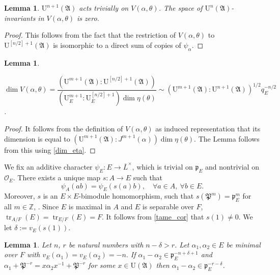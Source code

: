 \documentclass[11pt]{article}
\newcommand{\skpt}{\smallskip}
\let\mathcal\mathscr
\newtheorem{lem}[prop]{Lemma}
\theoremstyle{definition}
\DeclareMathOperator{\tr}{tr}
\newcommand{\ZZ}{\mathbb Z}
\newcommand{\Aa}{\mathfrak A}
\newcommand{\Pp}{\mathfrak P}
\newcommand{\cO}{\mathcal{O}}
\newcommand{\pp}{\mathfrak p}
\newcommand{\UU}{\mathrm U}
\newcommand{\Lbar}{\overline{L}}
\begin{document}
\begin{lem}\label{invariants_super} $\UU^{n+1}(\Aa)$ acts trivially on $V(\alpha, \theta)$. The space of $\UU^n(\Aa)$-invariants in $V(\alpha, \theta)$ is zero.
\end{lem}

\begin{proof} This follows from the fact that the restriction of $V(\alpha, \theta)$ to $\UU^{[n/2]+1}(\Aa)$ is isomorphic to a direct sum of copies of $\psi_{\alpha}$.
\end{proof}

\skpt
\begin{lem}\label{dim_V}\mbox{}\par\vspace*{-10pt}
\centerline{
$\dim V(\alpha, \theta)=\dfrac{( \UU^{m+1}(\Aa): \UU^{[n/2]+1}(\Aa))}{ (\UU^{m+1}_E : \UU^{[n/2]+1}_E)\dim \eta(\theta)}\sim (\UU^{m+1}(\Aa): \UU^{n+1}(\Aa))^{1/2} q_E^{-n/2}$.}
\end{lem}

\begin{proof} It follows from the definition of $V(\alpha, \theta)$ as induced representation that its dimension is equal to $(\UU^{m+1}(\Aa): J^{m+1}(\alpha)) \dim \eta(\theta)$. The Lemma follows from this using \eqref{dim_eta}.
\end{proof}

We fix an additive character $\psi_E: E\to \Lbar^{\times}$, which is trivial on $\pp_E$ and nontrivial on $\cO_E$. There exists a unique map $s: A\to E$ such that
\begin{equation}\label{tame_cor}
\psi_A(ab)= \psi_E(s(a) b), \quad \forall a\in A,\ \forall b\in E.
\end{equation}
Moreover, $s$ is an $E\times E$-bimodule homomorphism, such that $s(\Pp^m)= \pp_E^m$ for all $m\in \ZZ$, \cite[(1.3.4)]{BK}. Since
$E$ is maximal in $A$ and $E$ is separable over $F$, $\tr_{A/F}(E)=\tr_{E/F}(E)=F$. It follows from \eqref{tame_cor} that $s(1)\neq 0$.
We let $\delta:= v_E(s(1))$.

\begin{lem}\label{main_lemma} Let $n$, $r$ be natural numbers with $n-\delta> r$.
Let $\alpha_1,\alpha_2\in E$ be minimal over $F$ with $v_E(\alpha_1)=v_E(\alpha_2)=-n.$ If $\alpha_1 - \alpha_2 \in \pp_E^{-n +\delta+1}$
and $\alpha_1+ \Pp^{-r} = x \alpha_2 x^{-1} + \Pp^{-r}$ for some $x\in \UU(\Aa)$ then $\alpha_1-\alpha_2 \in \pp_E^{-r-\delta}$.
\end{lem}
\end{document}
